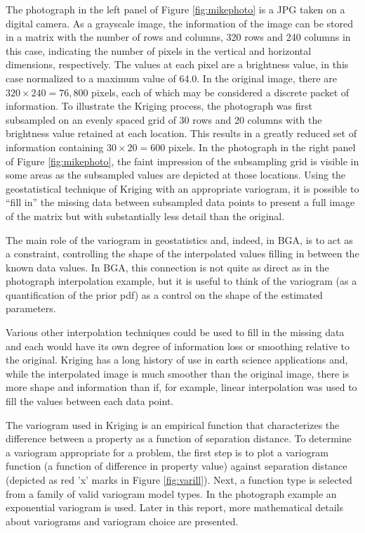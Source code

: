 \documentclass[11pt,oneside,onecolumn]{usgsreport}
\begin{document}
\begin{multicols}{2}
The photograph in the left panel of Figure \ref{fig:mikephoto} is
a JPG taken on a digital camera. As a grayscale image, the information
of the image can be stored in a matrix with the number of rows and
columns, 320 rows and 240 columns in this case, indicating the number
of pixels in the vertical and horizontal dimensions, respectively.
The values at each pixel are a brightness value, in this case normalized
to a maximum value of 64.0. In the original image, there are $320\times240=76,800$
pixels, each of which may be considered a discrete packet of information.
To illustrate the Kriging process, the photograph was first subsampled
on an evenly spaced grid of 30 rows and 20 columns with the brightness
value retained at each location. This results in a greatly reduced
set of information containing $30\times20=600$ pixels. In the photograph
in the right panel of Figure \ref{fig:mikephoto}, the faint impression
of the subsampling grid is visible in some areas as the subsampled
values are depicted at those locations. Using the geostatistical technique
of Kriging with an appropriate variogram, it is possible to ``fill
in'' the missing data between subsampled data points to present a
full image of the matrix but with substantially less detail than the
original. 

The main role of the variogram in geostatistics and, indeed, in BGA,
is to act as a constraint, controlling the shape of the interpolated
values filling in between the known data values. In BGA, this connection
is not quite as direct as in the photograph interpolation example,
but it is useful to think of the variogram (as a quantification of
the prior pdf) as a control on the shape of the estimated parameters. 

Various other interpolation techniques could be used to fill in the
missing data and each would have its own degree of information loss
or smoothing relative to the original. Kriging has a long history
of use in earth science applications and, while the interpolated image
is much smoother than the original image, there is more shape and
information than if, for example, linear interpolation was used to
fill the values between each data point.

The variogram used in Kriging is an empirical function that characterizes
the difference between a property as a function of separation distance.
To determine a variogram appropriate for a problem, the first step
is to plot a variogram function (a function of difference in property
value) against separation distance (depicted as red 'x' marks in Figure
\ref{fig:varill}). Next, a function type is selected from a family
of valid variogram model types. In the photograph example an exponential
variogram is used. Later in this report, more mathematical details
about variograms and variogram choice are presented.


\end{multicols}
\end{document}
